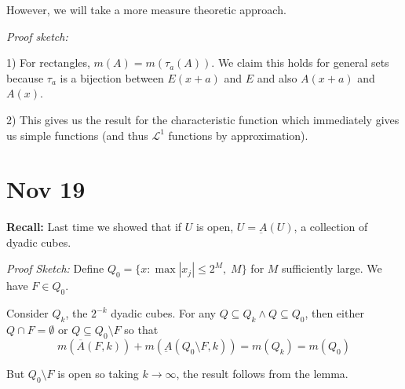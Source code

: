 \documentclass[12pt]{report}
\newcommand{\R}{\mathbb{R}}
\newcommand{\C}{\mathbb{C}}
\newcommand{\abs}[1]{\left\vert #1 \right\vert}
\renewcommand{\L}{\mathcal{L}}
\newcommand{\sub}{\subseteq}
\renewcommand{\bar}[1]{\overline{#1}}
\newcommand*{\tbf}[1]{\ifmmode\mathbf{#1}\else\textbf{#1}\fi}
\newenvironment*{tbox}[2][gray]{
    \begin{tcolorbox}[
        parbox=false,
        colback=#1!5!white,
        colframe=#1!75!black,
        breakable,
        title={#2}
    ]}
    {\end{tcolorbox}}
\begin{document}
    However, we will take a more measure theoretic approach. 

    \begin{tbox}{\textbf{Theorem (Translation Invariance):} Let $\tau_a(x) = x + a$ for $a \in \R^n$. Then,
        \begin{enumerate}
            \item $m(\tau_a(E)) = m(E)$
            \item If $f: \R^n \to \C$ is either $\geq 0$ or in $\L^1$, 
            \[\int f(x + a)\; d\mu= \int f\; d\mu \]
        \end{enumerate}}
        \emph{Proof sketch:} 
        
        1) For rectangles, $m(A) = m(\tau_a(A))$. We claim this holds for general sets because $\tau_a$ is a bijection between $E(x + a)$ and $E$ and also $A(x + a)$ and $A(x)$.
        
        2) This gives us the result for the characteristic function which immediately gives us simple functions (and thus $\L^1$ functions by approximation).

    \end{tbox}

\section{Nov 19}
    \tbf{Recall:} Last time we showed that if $U$ is open, $U = \underbar A(U)$, a collection of dyadic cubes.

    \begin{tbox}{\textbf{Corollary:} Let $U$ be open, then the \tbf{inner content} is $m(U) = m(\underbar A(U))$. Let $F \sub \R^n$ be a compact set. Then the \tbf{outer content} is $m(F) = m(\bar A(F))$.} 
        \emph{Proof Sketch:} Define $Q_0 = \{x: \max\abs{x_j} \leq 2^M, \; M\}$ for $M$ sufficiently large. We have $F \in Q_0$. 

        Consider $Q_k$, the $2^{-k}$ dyadic cubes. For any $Q \sub Q_k \land Q \sub Q_0$, then either $Q \cap F = \emptyset$ or $Q \sub Q_0\setminus F$ so that 
        \[m(\bar A(F, k)) + m(\underbar A(Q_0 \setminus F, k)) = m(Q_k) = m(Q_0)\]

        But $Q_0 \setminus F$ is open so taking $k \to \infty$, the result follows from the lemma.
    \end{tbox}
\end{document}

